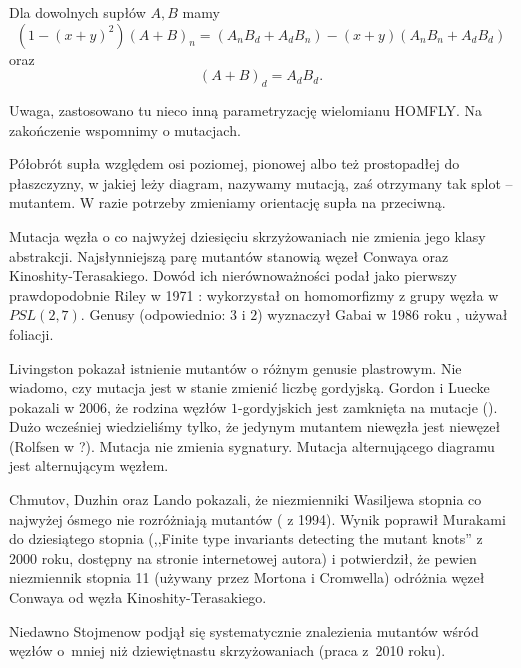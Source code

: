 \begin{proposition}
	Dla dowolnych supłów $A, B$ mamy
	\[
	(1 - (x+y)^2)(A+B)_n = (A_nB_d + A_dB_n) - (x+y)(A_nB_n+  A_dB_d)
	\]
	oraz
	\[
		(A+B)_d = A_dB_d.
	\]
\end{proposition}

Uwaga, zastosowano tu nieco inną parametryzację wielomianu HOMFLY.
Na zakończenie wspomnimy o mutacjach.

\begin{definition}[mutacja]
\label{def:mutant}
	Półobrót supła względem osi poziomej, pionowej albo też prostopadłej do płaszczyzny, w jakiej leży diagram, nazywamy mutacją, zaś otrzymany tak splot -- mutantem.
	W razie potrzeby zmieniamy orientację supła na przeciwną.
\end{definition}

Mutacja węzła o co najwyżej dziesięciu skrzyżowaniach nie zmienia jego klasy abstrakcji.
Najsłynniejszą parę mutantów stanowią węzeł Conwaya oraz Kinoshity-Terasakiego.
Dowód ich nierównoważności podał jako pierwszy prawdopodobnie Riley w 1971 \cite{riley71}:
wykorzystał on homomorfizmy z grupy węzła w $PSL(2, 7)$.
Genusy (odpowiednio: $3$ i $2$) wyznaczył Gabai w 1986 roku \cite{gabai86}, używał foliacji.

Livingston pokazał istnienie mutantów o różnym genusie plastrowym.
Nie wiadomo, czy mutacja jest w stanie zmienić liczbę gordyjską.
Gordon i Luecke pokazali w 2006, że rodzina węzłów $1$-gordyjskich jest zamknięta na mutacje (\cite{gordon06}).
Dużo wcześniej wiedzieliśmy tylko, że jedynym mutantem niewęzła jest niewęzeł (Rolfsen w \cite{rolfsen93}?).
Mutacja nie zmienia sygnatury.
Mutacja alternującego diagramu jest alternującym węzłem.

Chmutov, Duzhin oraz Lando pokazali, że niezmienniki Wasiljewa stopnia co najwyżej ósmego nie rozróżniają mutantów (\cite{chmutov94} z 1994).
Wynik poprawił Murakami do dziesiątego stopnia (,,Finite type invariants detecting the mutant knots'' z 2000 roku, dostępny na stronie internetowej autora) i potwierdził, że pewien niezmiennik stopnia 11 (używany przez Mortona i Cromwella) odróżnia węzeł Conwaya od węzła Kinoshity-Terasakiego.

Niedawno Stojmenow podjął się systematycznie znalezienia mutantów wśród węzłów o~mniej niż dziewiętnastu skrzyżowaniach (praca \cite{stoimenow10} z~2010 roku).



